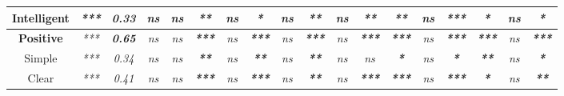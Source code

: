 \begin{sidewaystable}
\begin{tabular}{c|cc|ccccccccccccccc|}
        \multicolumn{1}{|c|}{Intelligent}            & \multicolumn{1}{c|}{\textit{***}} & \textit{0.33}          & \multicolumn{1}{c|}{\textit{ns}} & \multicolumn{1}{c|}{\textit{ns}} & \multicolumn{1}{c|}{\textit{\textbf{**}}}  & \multicolumn{1}{c|}{\textit{ns}}          & \multicolumn{1}{c|}{\textit{\textbf{*}}}   & \multicolumn{1}{c|}{\textit{ns}} & \multicolumn{1}{c|}{\textit{\textbf{**}}}  & \multicolumn{1}{c|}{\textit{ns}} & \multicolumn{1}{c|}{\textit{\textbf{**}}}  & \multicolumn{1}{c|}{\textit{\textbf{**}}}  & \multicolumn{1}{c|}{\textit{ns}}         & \multicolumn{1}{c|}{\textit{\textbf{***}}} & \multicolumn{1}{c|}{\textit{\textbf{*}}}   & \multicolumn{1}{c|}{\textit{ns}} & \textit{\textbf{*}}   \\ \hline
        \multicolumn{1}{|c|}{\textbf{Positive}}      & \multicolumn{1}{c|}{\textit{***}} & \textit{\textbf{0.65}} & \multicolumn{1}{c|}{\textit{ns}} & \multicolumn{1}{c|}{\textit{ns}} & \multicolumn{1}{c|}{\textit{\textbf{***}}} & \multicolumn{1}{c|}{\textit{ns}}          & \multicolumn{1}{c|}{\textit{\textbf{***}}} & \multicolumn{1}{c|}{\textit{ns}} & \multicolumn{1}{c|}{\textit{\textbf{***}}} & \multicolumn{1}{c|}{\textit{ns}} & \multicolumn{1}{c|}{\textit{\textbf{***}}} & \multicolumn{1}{c|}{\textit{\textbf{***}}} & \multicolumn{1}{c|}{\textit{ns}}         & \multicolumn{1}{c|}{\textit{\textbf{***}}} & \multicolumn{1}{c|}{\textit{\textbf{***}}} & \multicolumn{1}{c|}{\textit{ns}} & \textit{\textbf{***}} \\ \hline
        \multicolumn{1}{|c|}{Simple}                 & \multicolumn{1}{c|}{\textit{***}} & \textit{0.34}          & \multicolumn{1}{c|}{\textit{ns}} & \multicolumn{1}{c|}{\textit{ns}} & \multicolumn{1}{c|}{\textit{\textbf{**}}}  & \multicolumn{1}{c|}{\textit{ns}}          & \multicolumn{1}{c|}{\textit{\textbf{**}}}  & \multicolumn{1}{c|}{\textit{ns}} & \multicolumn{1}{c|}{\textit{\textbf{**}}}  & \multicolumn{1}{c|}{\textit{ns}} & \multicolumn{1}{c|}{\textit{ns}}           & \multicolumn{1}{c|}{\textit{\textbf{*}}}   & \multicolumn{1}{c|}{\textit{ns}}         & \multicolumn{1}{c|}{\textit{\textbf{*}}}   & \multicolumn{1}{c|}{\textit{\textbf{**}}}  & \multicolumn{1}{c|}{\textit{ns}} & \textit{\textbf{*}}   \\ \hline
        \multicolumn{1}{|c|}{Clear}                  & \multicolumn{1}{c|}{\textit{***}} & \textit{0.41}          & \multicolumn{1}{c|}{\textit{ns}} & \multicolumn{1}{c|}{\textit{ns}} & \multicolumn{1}{c|}{\textit{\textbf{***}}} & \multicolumn{1}{c|}{\textit{ns}}          & \multicolumn{1}{c|}{\textit{\textbf{***}}} & \multicolumn{1}{c|}{\textit{ns}} & \multicolumn{1}{c|}{\textit{\textbf{**}}}  & \multicolumn{1}{c|}{\textit{ns}} & \multicolumn{1}{c|}{\textit{\textbf{***}}} & \multicolumn{1}{c|}{\textit{\textbf{***}}} & \multicolumn{1}{c|}{\textit{ns}}         & \multicolumn{1}{c|}{\textit{\textbf{***}}} & \multicolumn{1}{c|}{\textit{\textbf{*}}}   & \multicolumn{1}{c|}{\textit{ns}} & \textit{\textbf{**}}  \\ \hline

\end{tabular}
\end{sidewaystable}
